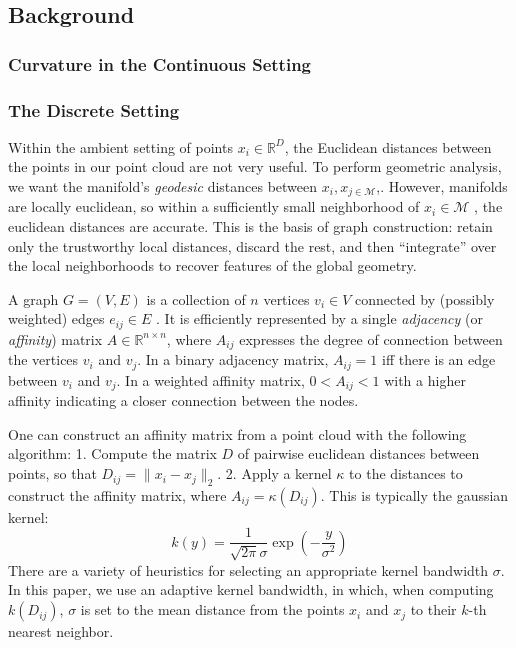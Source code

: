 \documentclass[
]{agujournal2019}
\begin{document}
\subsection{Background}\label{background}

\subsubsection{Curvature in the Continuous
Setting}\label{curvature-in-the-continuous-setting}

\subsubsection{The Discrete Setting}\label{the-discrete-setting}

Within the ambient setting of points \(x_{i} \in \mathbb{R}^D\), the
Euclidean distances between the points in our point cloud are not very
useful. To perform geometric analysis, we want the manifold's
\emph{geodesic} distances between \(x_{i}, x_{j \in \mathcal{M}}\),.
However, manifolds are locally euclidean, so within a sufficiently small
neighborhood of \(x_{i} \in \mathcal{M}\) , the euclidean distances are
accurate. This is the basis of graph construction: retain only the
trustworthy local distances, discard the rest, and then ``integrate''
over the local neighborhoods to recover features of the global geometry.

A graph \(G = (V, E)\) is a collection of \(n\) vertices \(v_{i} \in V\)
connected by (possibly weighted) edges \(e_{ij} \in E\) . It is
efficiently represented by a single \emph{adjacency} (or
\emph{affinity}) matrix \(A \in \mathbb{R}^{n \times n}\), where
\(A_{ij}\) expresses the degree of connection between the vertices
\(v_{i}\) and \(v_{j}\). In a binary adjacency matrix, \(A_{ij}=1\) iff
there is an edge between \(v_{i}\) and \(v_{j}\). In a weighted affinity
matrix, \(0<A_{ij}<1\) with a higher affinity indicating a closer
connection between the nodes.

One can construct an affinity matrix from a point cloud with the
following algorithm: 1. Compute the matrix \(D\) of pairwise euclidean
distances between points, so that \(D_{ij}=\|x_{i}-x_{j}\|_{2}\). 2.
Apply a kernel \(\kappa\) to the distances to construct the affinity
matrix, where \(A_{ij} = \kappa(D_{ij})\). This is typically the
gaussian kernel: \[
k(y) = \frac{1}{\sqrt{ 2\pi }\sigma}\exp\left( -\frac{y}{\sigma^2} \right)
\] There are a variety of heuristics for selecting an appropriate kernel
bandwidth \(\sigma\). In this paper, we use an adaptive kernel
bandwidth, in which, when computing \(k(D_{ij})\), \(\sigma\) is set to
the mean distance from the points \(x_{i}\) and \(x_{j}\) to their
\(k\)-th nearest neighbor.
\end{document}
